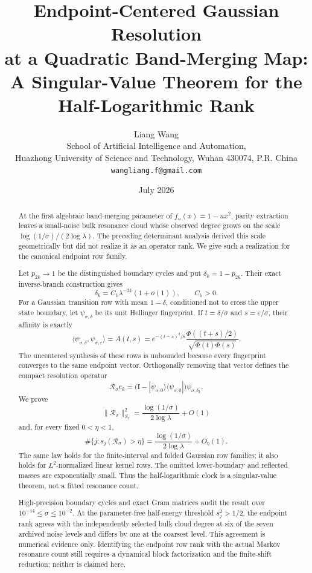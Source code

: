 \documentclass[11pt]{article}
\title{\textbf{Endpoint-Centered Gaussian Resolution}\\
\textbf{at a Quadratic Band-Merging Map:}\\[0.35em]
\large A Singular-Value Theorem for the Half-Logarithmic Rank}
\author{Liang Wang\\
\small School of Artificial Intelligence and Automation,\\[-0.2em]
\small Huazhong University of Science and Technology, Wuhan 430074, P.R. China\\
\small \texttt{wangliang.f@gmail.com}}
\date{July 2026}
\theoremstyle{definition}
\theoremstyle{remark}
\newcommand{\cR}{\mathcal R}
\newcommand{\Id}{\mathrm I}
\begin{document}
\maketitle

\begin{abstract}
At the first algebraic band-merging parameter of
$f_u(x)=1-u x^2$, parity extraction leaves a small-noise bulk resonance cloud
whose observed degree grows on the scale
$\log(1/\sigma)/(2\log\lambda)$.  The preceding determinant analysis derived
this scale geometrically but did not realize it as an operator rank.  We give
such a realization for the canonical endpoint row family.

Let $p_{2k}\to1$ be the distinguished boundary cycles and put
$\delta_k=1-p_{2k}$.  Their exact inverse-branch construction gives
\[
 \delta_k=C_{\mathrm b}\lambda^{-2k}(1+o(1)),
 \qquad C_{\mathrm b}>0.
\]
For a Gaussian transition row with mean $1-\delta$, conditioned not to cross
the upper state boundary, let $\psi_{\sigma,\delta}$ be its unit Hellinger
fingerprint.  If $t=\delta/\sigma$ and $s=\varepsilon/\sigma$, their affinity
is exactly
\[
 \langle\psi_{\sigma,\delta},\psi_{\sigma,\varepsilon}\rangle
 =A(t,s)
 =e^{-(t-s)^2/8}
 \frac{\Phi((t+s)/2)}{\sqrt{\Phi(t)\Phi(s)}}.
\]
The uncentered synthesis of these rows is unbounded because every fingerprint
converges to the same endpoint vector.  Orthogonally removing that vector
defines the compact resolution operator
\[
 \cR_\sigma e_k
 =\bigl(\Id-|\psi_{\sigma,0}\rangle
 \langle\psi_{\sigma,0}|\bigr)\psi_{\sigma,\delta_k}.
\]
We prove
\[
 \|\cR_\sigma\|_{S_2}^2
 =\frac{\log(1/\sigma)}{2\log\lambda}+O(1)
\]
and, for every fixed $0<\eta<1$,
\[
 \boxed{
 \#\{j:s_j(\cR_\sigma)>\eta\}
 =\frac{\log(1/\sigma)}{2\log\lambda}+O_\eta(1).}
\]
The same law holds for the finite-interval and folded Gaussian row families;
it also holds for $L^2$-normalized linear kernel rows.  The omitted
lower-boundary and reflected masses are exponentially small.
Thus the half-logarithmic clock is a singular-value theorem, not a fitted
resonance count.

High-precision boundary cycles and exact Gram matrices audit the result over
$10^{-14}\le\sigma\le10^{-2}$.  At the parameter-free half-energy threshold
$s_j^2>1/2$, the endpoint rank agrees with the independently selected bulk
cloud degree at six of the seven archived noise levels and differs by one at
the coarsest level.  This agreement is numerical evidence only.  Identifying
the endpoint row rank with the actual Markov resonance count still requires
a dynamical block factorization and the finite-shift reduction; neither is
claimed here.
\end{abstract}
\end{document}
